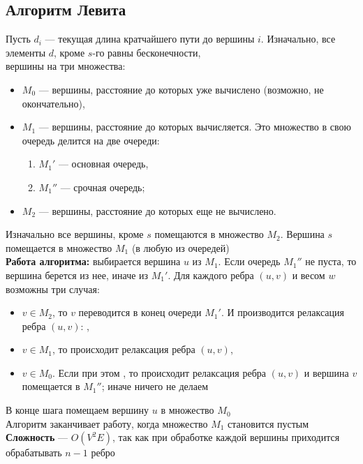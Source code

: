 \documentclass[a4paper]{article}
\begin{document}
\subsection{Алгоритм Левита}
Пусть $d_i$ — текущая длина кратчайшего пути до вершины $i$. Изначально, все элементы $d$, кроме $s$-го равны бесконечности, \\[2mm]
 вершины на три множества:
\begin{itemize}
    \item $M_0$ — вершины, расстояние до которых уже вычислено (возможно, не окончательно),
    \item $M_1$ — вершины, расстояние до которых вычисляется. Это множество в свою очередь делится на две очереди:
    \begin{enumerate}
        \item $M_1'$ — основная очередь,
        \item $M_1''$ — срочная очередь;
    \end{enumerate}
    \item $M_2$ — вершины, расстояние до которых еще не вычислено.
\end{itemize}
Изначально все вершины, кроме $s$ помещаются в множество $M_2$. Вершина $s$ помещается в множество $M_1$ (в любую из очередей)\\[2mm]
\indent\textbf{Работа алгоритма:} выбирается вершина $u$ из $M_1$. Если очередь $M_1''$ не пуста, то вершина берется из нее, иначе из $M_1'$. Для каждого ребра $(u,v)$ и весом $w$ возможны три случая:
\begin{itemize}
    \item $v \in M_2$, то $v$ переводится в конец очереди $M_1'$. И производится релаксация ребра $(u,v)$: ,
    \item $v \in M_1$, то происходит релаксация ребра $(u,v)$,
    \item $v \in M_0$. Если при этом , то происходит релаксация ребра $(u,v)$ и вершина $v$ помещается в $M_1''$; иначе ничего не делаем
\end{itemize}
В конце шага помещаем вершину $u$ в множество $M_0$\\[2mm]
Алгоритм заканчивает работу, когда множество $M_1$ становится пустым\\[2mm]
\indent\textbf{Сложность} — $O(V^2E)$, так как при обработке каждой вершины приходится обрабатывать $n-1$ ребро
\end{document}
